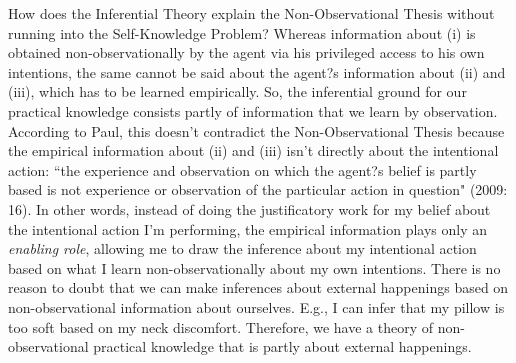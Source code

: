 \documentclass[a4paper,12pt]{article}
\begin{document}

How does the Inferential Theory explain the Non-Observational Thesis without running into the Self-Knowledge Problem? Whereas information about (i) is obtained non-observationally by the agent via his privileged access to his own intentions, the same cannot be said about the agent?s information about (ii) and (iii), which has to be learned empirically. So, the inferential ground for our practical knowledge consists partly of information that we learn by observation. According to Paul, this doesn't contradict the Non-Observational Thesis because the empirical information about (ii) and (iii) isn't directly about the intentional action: ``the experience and observation on which the agent?s belief is partly based is not experience or observation of the particular action in question" (2009: 16). In other words, instead of doing the justificatory work for my belief about the intentional action I'm performing, the empirical information plays only an \emph{enabling role}, allowing me to draw the inference about my intentional action based on what I learn non-observationally about my own intentions. There is no reason to doubt that we can make inferences about external happenings based on non-observational information about ourselves. E.g., I can infer that my pillow is too soft based on my neck discomfort. Therefore, we have a theory of non-observational practical knowledge that is partly about external happenings.
\end{document}

